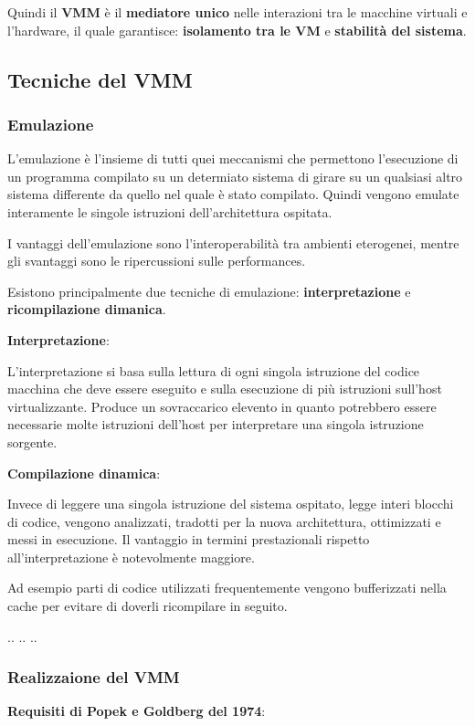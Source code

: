 \documentclass{article}
\begin{document}
Quindi il \textbf{VMM} è il \textbf{mediatore unico} nelle interazioni tra le macchine virtuali e
l'hardware, il quale garantisce: \textbf{isolamento tra le VM} e \textbf{stabilità del sistema}.

\subsection{Tecniche del VMM}
\subsubsection{Emulazione}
L'emulazione è l'insieme di tutti quei meccanismi che permettono l'esecuzione di un programma compilato su un determiato sistema di girare su un qualsiasi altro sistema differente da quello nel quale è stato compilato.
Quindi vengono emulate interamente le singole istruzioni dell'architettura ospitata.

I vantaggi dell'emulazione sono l'interoperabilità tra ambienti eterogenei, mentre gli svantaggi sono le ripercussioni sulle performances.

\vspace{5mm}
Esistono principalmente due tecniche di emulazione: \textbf{interpretazione} e \textbf{ricompilazione dimanica}.

\vspace{5mm}
\textbf{Interpretazione}:

L'interpretazione si basa sulla lettura di ogni singola istruzione del codice macchina che deve essere eseguito e sulla esecuzione di più istruzioni sull'host virtualizzante.
Produce un sovraccarico elevento in quanto potrebbero essere necessarie molte istruzioni dell'host per interpretare una singola istruzione sorgente.

\vspace{5mm}
\textbf{Compilazione dinamica}:

Invece di leggere una singola istruzione del sistema ospitato, legge interi blocchi di codice, vengono analizzati, tradotti per la nuova architettura, ottimizzati e messi in esecuzione.
Il vantaggio in termini prestazionali rispetto all'interpretazione è notevolmente maggiore.

Ad esempio parti di codice utilizzati frequentemente vengono bufferizzati nella cache per evitare di doverli ricompilare in seguito.


..
..
..

\subsubsection{Realizzaione del VMM}
\textbf{Requisiti di Popek e Goldberg del 1974}:
\end{document}
